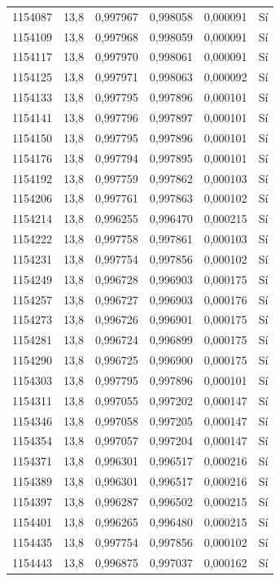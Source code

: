 \begin{longtable}{lccccc}
1154087 & 13,8 & 0,997967 & 0,998058 & 0,000091 & Sí \\
1154109 & 13,8 & 0,997968 & 0,998059 & 0,000091 & Sí \\
1154117 & 13,8 & 0,997970 & 0,998061 & 0,000091 & Sí \\
1154125 & 13,8 & 0,997971 & 0,998063 & 0,000092 & Sí \\
1154133 & 13,8 & 0,997795 & 0,997896 & 0,000101 & Sí \\
1154141 & 13,8 & 0,997796 & 0,997897 & 0,000101 & Sí \\
1154150 & 13,8 & 0,997795 & 0,997896 & 0,000101 & Sí \\
1154176 & 13,8 & 0,997794 & 0,997895 & 0,000101 & Sí \\
1154192 & 13,8 & 0,997759 & 0,997862 & 0,000103 & Sí \\
1154206 & 13,8 & 0,997761 & 0,997863 & 0,000102 & Sí \\
1154214 & 13,8 & 0,996255 & 0,996470 & 0,000215 & Sí \\
1154222 & 13,8 & 0,997758 & 0,997861 & 0,000103 & Sí \\
1154231 & 13,8 & 0,997754 & 0,997856 & 0,000102 & Sí \\
1154249 & 13,8 & 0,996728 & 0,996903 & 0,000175 & Sí \\
1154257 & 13,8 & 0,996727 & 0,996903 & 0,000176 & Sí \\
1154273 & 13,8 & 0,996726 & 0,996901 & 0,000175 & Sí \\
1154281 & 13,8 & 0,996724 & 0,996899 & 0,000175 & Sí \\
1154290 & 13,8 & 0,996725 & 0,996900 & 0,000175 & Sí \\
1154303 & 13,8 & 0,997795 & 0,997896 & 0,000101 & Sí \\
1154311 & 13,8 & 0,997055 & 0,997202 & 0,000147 & Sí \\
1154346 & 13,8 & 0,997058 & 0,997205 & 0,000147 & Sí \\
1154354 & 13,8 & 0,997057 & 0,997204 & 0,000147 & Sí \\
1154371 & 13,8 & 0,996301 & 0,996517 & 0,000216 & Sí \\
1154389 & 13,8 & 0,996301 & 0,996517 & 0,000216 & Sí \\
1154397 & 13,8 & 0,996287 & 0,996502 & 0,000215 & Sí \\
1154401 & 13,8 & 0,996265 & 0,996480 & 0,000215 & Sí \\
1154435 & 13,8 & 0,997754 & 0,997856 & 0,000102 & Sí \\
1154443 & 13,8 & 0,996875 & 0,997037 & 0,000162 & Sí \\

\end{longtable}
